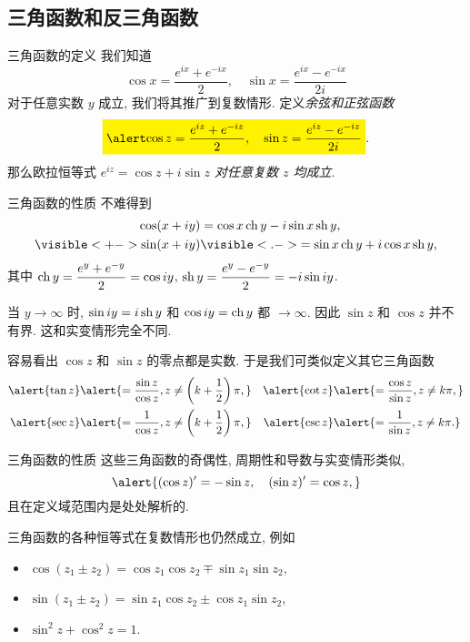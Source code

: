 \subsection{三角函数和反三角函数}
\begin{frame}{三角函数的定义}
\onslide<+->
我们知道
\[\cos x=\frac{e^{ix}+e^{-ix}}2,\quad
\sin x=\frac{e^{ix}-e^{-ix}}{2i}\]
对于任意实数 $y$ 成立,
\onslide<+->
我们将其推广到复数情形.
\onslide<+->
定义\emph{余弦和正弦函数}
\[\abox{$\displaystyle\cos z=\frac{e^{iz}+e^{-iz}}2,\quad
\sin z=\frac{e^{iz}-e^{-iz}}{2i}$}.\]
\onslide<+->
那么欧拉恒等式 \emph{$e^{iz}=\cos z+i\sin z$ 对任意复数 $z$ 均成立}.
\end{frame}


\begin{frame}{三角函数的性质}
\onslide<+->
不难得到
\begin{align*}
\cos(x+iy)&
=\cos x \ch y-i\sin x\sh y,\\
\visible<+->{\sin(x+iy)}&
\visible<.->{=\sin x\ch y+i\cos x\sh y,}
\end{align*}
\onslide<+->
其中 $\operatorname{ch} y=\dfrac{e^y+e^{-y}}2=\cos{iy}$, $\operatorname{sh} y=\dfrac{e^y-e^{-y}}2=-i\sin{iy}$.

\onslide<+->
当 $y\to\infty$ 时, $\sin iy=i\operatorname{sh} y$ 和 $\cos iy=\operatorname{ch} y$ 都 $\to\infty$.
\onslide<+->
因此 \alert{$\sin z$ 和 $\cos z$ 并不有界}. 
\onslide<+->
这和实变情形完全不同.

\onslide<+->
容易看出 $\cos z$ 和 $\sin z$ 的零点都是实数.
\onslide<+->
于是我们可类似定义其它三角函数
\begin{align*}
\alert{\tan z}&
\alert{=\frac{\sin z}{\cos z},z\neq\left(k+\half\right)\pi,}&
\alert{\cot z}&
\alert{=\frac{\cos z}{\sin z},z\neq k\pi,}\\
\alert{\sec z}&
\alert{=\frac{1}{\cos z},z\neq\left(k+\half\right)\pi,}&
\alert{\csc z}&
\alert{=\frac{1}{\sin z},z\neq k\pi.}
\end{align*}
\end{frame}


\begin{frame}{三角函数的性质}
\onslide<+->
这些三角函数的奇偶性, 周期性和导数与实变情形类似,
\[\alert{(\cos z)'=-\sin z,\quad
(\sin z)'=\cos z,}\]
\onslide<+->
且在定义域范围内是处处解析的.

\onslide<+->
三角函数的各种恒等式在复数情形也仍然成立,
\onslide<+->
例如
\begin{itemize}
\item $\cos(z_1\pm z_2)=\cos z_1 \cos z_2\mp \sin z_1 \sin z_2$,
\item $\sin(z_1\pm z_2)=\sin z_1 \cos z_2\pm\cos z_1 \sin z_2$,
\item $\sin^2z+\cos^2z=1$.
\end{itemize}
\end{frame}


